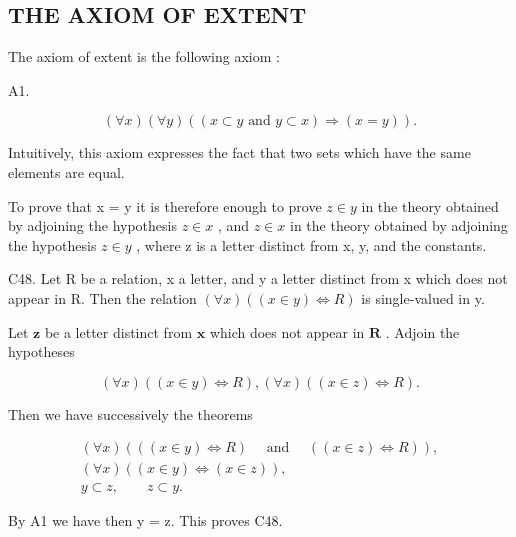 \subsection{THE AXIOM OF EXTENT}

The axiom of extent is the following axiom :

A1.

\[
(\forall x) (\forall y) ((x \subset y \text {   and   } y \subset x) \Longrightarrow (x = y)).
\]

Intuitively, this axiom expresses the fact that two sets which have the same elements are equal.

To prove that x = y it is therefore enough to prove \(z \in y\) in the theory obtained by adjoining the hypothesis \(z \in x\) , and \(z \in x\) in the theory obtained by adjoining the hypothesis \(z \in y\) , where z is a letter distinct from x, y, and the constants.

C48. Let R be a relation, x a letter, and y a letter distinct from x which does not appear in R. Then the relation \((\forall x)((x \in y) \Longleftrightarrow R)\) is single-valued in y.

Let \(\pmb{z}\) be a letter distinct from \(\pmb{x}\) which does not appear in \(\pmb{R}\) . Adjoin the hypotheses

\[
(\forall x) ((x \in y) \Longleftrightarrow R), (\forall x) ((x \in z) \Longleftrightarrow R).
\]

Then we have successively the theorems

\[
\begin{array}{c} (\forall x) (((x \in y) \Longleftrightarrow R) \quad \text { and } \quad ((x \in z) \Longleftrightarrow R)), \\ (\forall x) ((x \in y) \Longleftrightarrow (x \in z)), \\ y \subset z, \qquad z \subset y. \end{array}
\]

By A1 we have then y = z. This proves C48.

